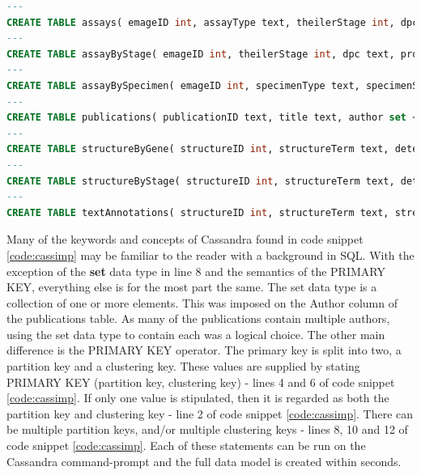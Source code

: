 \begin{lstlisting}[language=SQL, caption=Example of how to create tables in Cassandra., label=code:cassimp]
---
CREATE TABLE assays( emageID int, assayType text, theilerStage int, dpc text, specimenType text, specimenStrain text, probeID text, source text, PRIMARY KEY (emageID));
---
CREATE TABLE assayByStage( emageID int, theilerStage int, dpc text, probeID text, source text, PRIMARY KEY (theilerStage, emageID));
---
CREATE TABLE assayBySpecimen( emageID int, specimenType text, specimenStrain text, probeID text, source text, PRIMARY KEY (specimenType, emageID));
---
CREATE TABLE publications( publicationID text, title text, author set <text>, emageID int, PRIMARY KEY(emageID));
---
CREATE TABLE structureByGene( structureID int, structureTerm text, detected boolean, geneName text, geneID text, emageID int, PRIMARY KEY ((geneName, detected, structureID), emageID));
---
CREATE TABLE structureByStage( structureID int, structureTerm text, detected boolean, theilerStage int, dpc text, PRIMARY KEY ((theilerStage, detected), structureID));
---
CREATE TABLE textAnnotations( structureID int, structureTerm text, strength text, detected boolean, geneName text, geneID text, dpc text, theilerStage int, emageID int, PRIMARY KEY (emageid,structureID,detected);
\end{lstlisting}

Many of the keywords and concepts of Cassandra found in code snippet \ref{code:cassimp} may be familiar to the reader with a background in SQL. With the exception of the \textbf{set} data type in line 8 and the semantics of the PRIMARY KEY, everything else is for the most part the same. The set data type is a collection of one or more elements. This was imposed on the Author column of the publications table. As many of the publications contain multiple authors, using the set data type to contain each was a logical choice. The other main difference is the PRIMARY KEY operator. The primary key is split into two, a partition key and a clustering key. These values are supplied by stating PRIMARY KEY (partition key, clustering key) - lines 4 and 6 of code snippet \ref{code:cassimp}. If only one value is stipulated, then it is regarded as both the partition key and clustering key - line 2 of code snippet \ref{code:cassimp}. There can be multiple partition keys, and/or multiple clustering keys - lines 8, 10 and 12 of code snippet \ref{code:cassimp}. Each of these statements can be run on the Cassandra command-prompt and the full data model is created within seconds.

